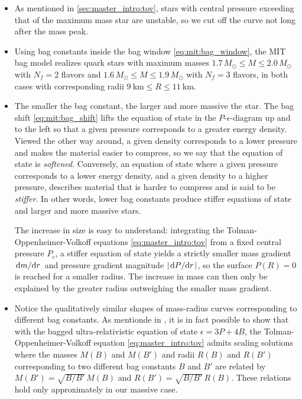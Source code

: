 \begin{itemize}
\item As mentioned in \cref{sec:master_intro:tov},
      stars with central pressure exceeding that of the maximum mass star are unstable,
      so we cut off the curve not long after the mass peak.
\item Using bag constants inside the bag window \eqref{eq:mit:bag_window},
      the MIT bag model realizes quark stars with maximum masses
      $1.7 \, M_\odot \leq M \leq 2.0 \, M_\odot$ with $N_f=2$ flavors
      and $1.6 \, M_\odot \leq M \leq 1.9 \, M_\odot$ with $N_f=3$ flavors,
      in both cases with corresponding radii $\SI{9}{\kilo\meter} \leq R \leq \SI{11}{\kilo\meter}$.
\item The smaller the bag constant, the larger and more massive the star.
      The bag shift \eqref{eq:mit:bag_shift} lifts the equation of state in the $P$-$\epsilon$-diagram up and to the left
      so that a given pressure corresponds to a greater energy density.
      Viewed the other way around, a given density corresponds to a lower pressure and makes the material easier to compress,
      so we say that the equation of state is \emph{softened}.
      Conversely, an equation of state where a given pressure corresponds to a lower energy density, and a given density to a higher pressure,
      describes material that is harder to compress and is said to be \emph{stiffer}.
      In other words, lower bag constants produce stiffer equations of state and larger and more massive stars.

      The increase in size is easy to understand:
      integrating the Tolman-Oppenheimer-Volkoff equations \eqref{eq:master_intro:tov} from a fixed central pressure $P_c$,
      a stiffer equation of state yields a strictly smaller mass gradient $\odv{m}/{r}$ and pressure gradient magnitude $\abs{\odv{P}/{r}}$,
      so the surface $P(R)=0$ is reached for a smaller radius.
      The increase in mass can then only be explained by the greater radius outweighing the smaller mass gradient.
\item Notice the qualitatively similar shapes of mass-radius curves corresponding to different bag constants.
      As mentionde in \cite[equation 8.29]{ref:glendenning},
      it is in fact possible to show that with the bagged ultra-relativistic equation of state $\epsilon = 3P + 4B$,
      the Tolman-Oppenheimer-Volkoff equation \eqref{eq:master_intro:tov} admits scaling solutions
      where the masses $M(B)$ and $M(B')$ and radii $R(B)$ and $R(B')$ corresponding to two different bag constants $B$ and $B'$
      are related by $M(B') = \sqrt{B/B'} \, M(B)$ and $R(B') = \sqrt{B/B'} \, R(B)$.
      These relations hold only approximately in our massive case.
\end{itemize}

